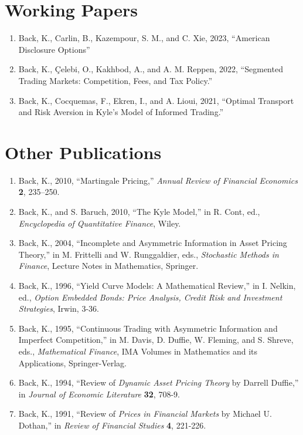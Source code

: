 \documentclass[margin, 11pt]{res}
\begin{document}
\begin{resume}
\section{\sc Working Papers}
\begin{enumerate}
\item Back, K., Carlin, B., Kazempour, S. M., and C. Xie, 2023, ``American Disclosure Options''
\item Back, K., \c{C}elebi, O., Kakhbod, A., and A. M. Reppen, 2022, ``Segmented Trading Markets: Competition, Fees, and Tax Policy.''
\item Back, K., Cocquemas, F., Ekren, I., and A. Lioui, 2021, ``Optimal Transport and Risk Aversion in Kyle's Model of Informed Trading.''

\end{enumerate}

\section{\sc Other Publications}
\begin{enumerate}
\item Back, K., 2010, ``Martingale Pricing,'' \textit{Annual Review of Financial Economics} \textbf{2}, 235--250.
\item Back, K., and S. Baruch, 2010, ``The Kyle Model,'' in R. Cont, ed., \textit{Encyclopedia of Quantitative Finance}, Wiley.
\item Back, K., 2004, ``Incomplete and Asymmetric Information in Asset Pricing Theory,'' in M. Frittelli and W. Runggaldier, eds., \textit{Stochastic Methods in Finance}, Lecture Notes in Mathematics, Springer.
\item Back, K., 1996, ``Yield Curve Models: A Mathematical Review,''
in I. Nelkin, ed., {\em Option Embedded
Bonds: Price Analysis, Credit Risk and Investment Strategies}, Irwin, 3-36.
\item Back, K., 1995, ``Continuous Trading with Asymmetric Information and Imperfect
Competition,'' in M. Davis, D. Duffie, W.
Fleming, and S. Shreve, eds., {\em Mathematical Finance},
IMA Volumes in Mathematics
and its Applications, Springer-Verlag.
\item Back, K., 1994, ``Review of {\em Dynamic Asset Pricing Theory\/} by Darrell Duffie,'' in
{\em Journal of Economic Literature\/} {\bf 32}, 708-9.
\item Back, K., 1991, ``Review of {\em Prices in Financial Markets\/} by Michael U.
Dothan,'' in {\em Review of Financial Studies\/} {\bf 4}, 221-226.
\end{enumerate}


\end{resume}
\end{document}
